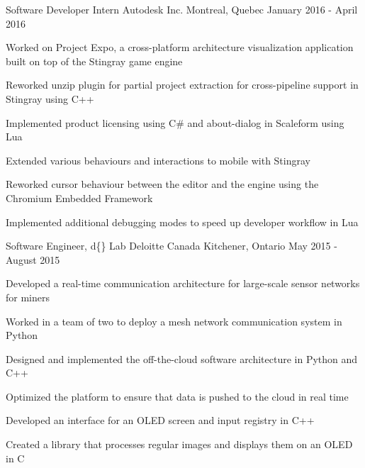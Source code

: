 


\begin{cventries}


\cventry
{Software Developer Intern}
{Autodesk Inc.}
{Montreal, Quebec}
{January 2016 - April 2016}
{ %
Worked on Project Expo, a cross-platform architecture visualization application built on top of the Stingray game engine
\begin{cvitems}
\item[]
\item {Reworked unzip plugin for partial project extraction for cross-pipeline support in Stingray using C++}
\item {Implemented product licensing using C\# and about-dialog in Scaleform using Lua}
\item {Extended various behaviours and interactions to mobile with Stingray}
\item {Reworked cursor behaviour between the editor and the engine using the Chromium Embedded Framework}
\item {Implemented additional debugging modes to speed up developer workflow in Lua}
\end{cvitems}
}


\cventry
{Software Engineer, d\{\} Lab}
{Deloitte Canada} %
{Kitchener, Ontario} %
{May 2015 - August 2015} %
{
Developed a real-time communication architecture for large-scale sensor networks for miners
\begin{cvitems}
\item[]
\item {Worked in a team of two to deploy a mesh network communication system in Python}
\item {Designed and implemented the off-the-cloud software architecture in Python and C++}
\item {Optimized the platform to ensure that data is pushed to the cloud in real time}
\item {Developed an interface for an OLED screen and input registry in C++}
\item {Created a library that processes regular images and displays them on an OLED in C}
\end{cvitems}
}


\end{cventries}
